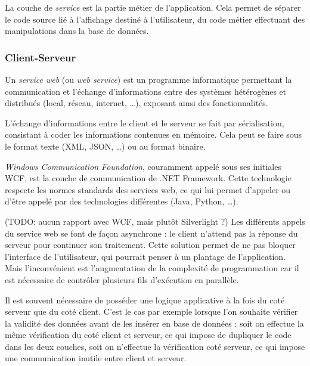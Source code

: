 La couche de \textit{service} est la partie métier de l'application. Cela permet de séparer le code source lié à l'affichage destiné à l'utilisateur, du code métier effectuant des manipulations dans la base de données.


\subsubsection{Client-Serveur}


Un \textit{service web} (ou \textit{web service}) est un programme informatique permettant la communication et l'échange d'informations entre des systèmes hétérogènes et distribués (local, réseau, internet, \ldots), exposant ainsi des fonctionnalités.

L'échange d'informations entre le client et le serveur se fait par sérialisation, consistant à coder les informations contenues en mémoire. Cela peut se faire sous le format texte (XML, JSON, \ldots) ou au format binaire.



\textit{Windows Communication Foundation}, couramment appelé sous ses initiales WCF, est la couche de communication de .NET Framework. Cette technologie respecte les normes standards des services web, ce qui lui permet d'appeler ou d'être appelé par des technologies différentes (Java, Python, \ldots).

(TODO: aucun rapport avec WCF, mais plutôt Silverlight ?)
Les différents appels du service web se font de façon asynchrone : le client n'attend pas la réponse du serveur pour continuer son traitement. Cette solution permet de ne pas bloquer l'interface de l'utilisateur, qui pourrait penser à un plantage de l'application. Mais l'inconvénient est l'augmentation de la complexité de programmation car il est nécessaire de contrôler plusieurs fils d'exécution en parallèle.



Il est souvent nécessaire de posséder une logique applicative à la fois du coté serveur que du coté client. C'est le cas par exemple lorsque l'on souhaite vérifier la validité des données avant de les insérer en base de données : soit on effectue la même vérification du coté client et serveur, ce qui impose de dupliquer le code dans les deux couches, soit on n'effectue la vérification coté serveur, ce qui impose une communication inutile entre client et serveur.

